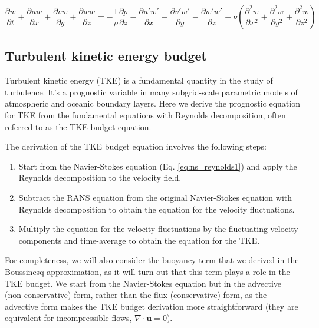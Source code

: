 \documentclass[12pt]{article}
\numberwithin{equation}{section}
\numberwithin{figure}{section}
\numberwithin{table}{section}
\begin{document}
\begin{equation}
  \frac{\partial \overline{w}}{\partial t} + 
  \frac{\partial \overline{u} \overline{w}}{\partial x} +
  \frac{\partial \overline{v} \overline{w}}{\partial y} +
  \frac{\partial \overline{w} \overline{w}}{\partial z} =
  - \frac{1}{\rho} \frac{\partial \overline{p}}{\partial z}
  - \frac{\partial \overline{u'w'}}{\partial x} - \frac{\partial \overline{v'w'}}{\partial y} - \frac{\partial \overline{w'w'}}{\partial z}
  + \nu \left( \frac{\partial^2 \overline{w}}{\partial x^2} + 
               \frac{\partial^2 \overline{w}}{\partial y^2} +
               \frac{\partial^2 \overline{w}}{\partial z^2}
        \right)
\end{equation}

\subsection{Turbulent kinetic energy budget}

Turbulent kinetic energy (TKE) is a fundamental quantity in the study of
turbulence.
It's a prognostic variable in many subgrid-scale parametric models of
atmospheric and oceanic boundary layers.
Here we derive the prognostic equation for TKE from the fundamental equations
with Reynolds decomposition, often referred to as the TKE budget equation.

The derivation of the TKE budget equation involves the following steps:

\begin{enumerate}
  \item Start from the Navier-Stokes equation (Eq. \ref{eq:ns_reynolds1})
  and apply the Reynolds decomposition to the velocity field.
  \item Subtract the RANS equation from the original Navier-Stokes equation
  with Reynolds decomposition to obtain the equation for the velocity
  fluctuations.
  \item Multiply the equation for the velocity fluctuations by the fluctuating
  velocity components and time-average to obtain the equation for the TKE.
\end{enumerate}

For completeness, we will also consider the buoyancy term that we derived in
the Boussinesq approximation, as it will turn out that this term plays a role
in the TKE budget.
We start from the Navier-Stokes equation but in the advective (non-conservative)
form, rather than the flux (conservative) form, as the advective form makes the
TKE budget derivation more straightforward (they are equivalent for
incompressible flows, $\nabla \cdot \mathbf{u} = 0$).
\end{document}
